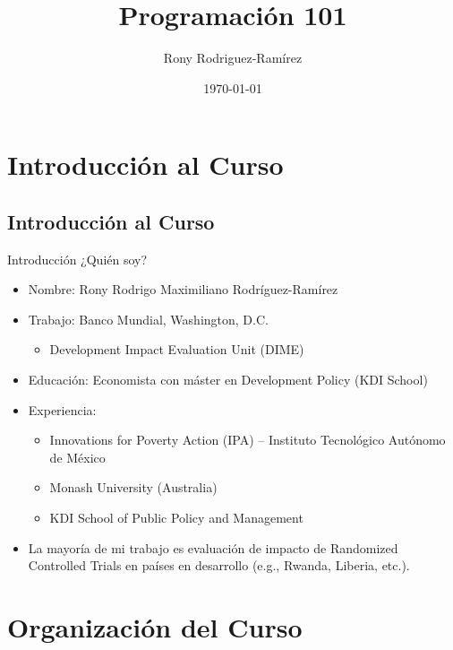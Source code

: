 \documentclass[11pt, aspectratio=169, compress]{beamer}
\title{Programación 101}
\author{Rony Rodriguez-Ramírez}
\institute{The World Bank | DIME \\ LAMBDA}
\date{\today}
\begin{document}
	
\begin{frame}[plain]
	\maketitle 
\end{frame}

\section{Introducción al Curso}
\subsection{Introducción al Curso}
\begin{frame}{Introducción}
	¿Quién soy? 
	\begin{itemize}
		\item Nombre: Rony Rodrigo Maximiliano Rodríguez-Ramírez
		\item Trabajo: Banco Mundial, Washington, D.C.  
		\begin{itemize}
			\item Development Impact Evaluation Unit (DIME)
		\end{itemize}
		\item Educación: Economista con máster en Development Policy (KDI School)
		\item Experiencia: 
		\begin{itemize}
			\item Innovations for Poverty Action (IPA) -- Instituto Tecnológico Autónomo de México
			\item Monash University (Australia)
			\item KDI School of Public Policy and Management
		\end{itemize} 
		\item La mayoría de mi trabajo es evaluación de impacto de Randomized Controlled Trials en países en desarrollo (e.g., Rwanda, Liberia, etc.).
	\end{itemize}
\end{frame}
\section{Organización del Curso}
\end{document}
